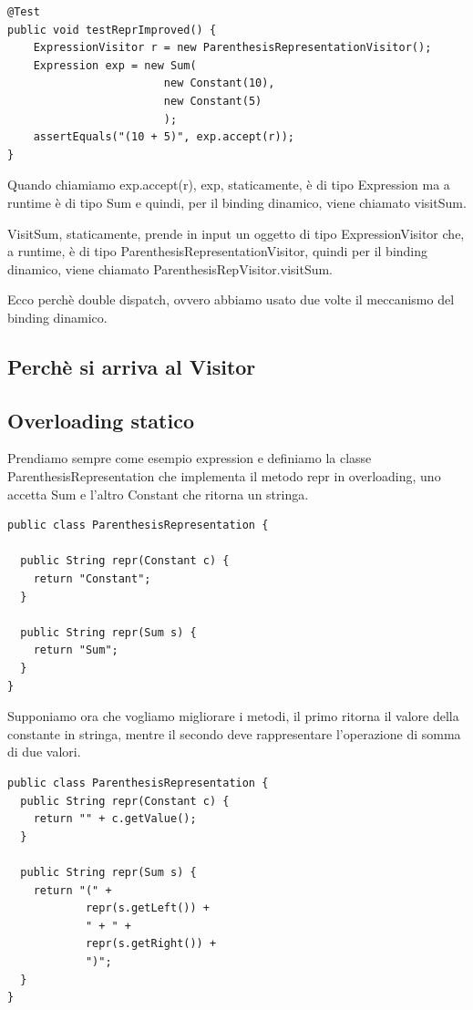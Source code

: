 \begin{lstlisting}
@Test
public void testReprImproved() {
    ExpressionVisitor r = new ParenthesisRepresentationVisitor();
    Expression exp = new Sum(
                        new Constant(10),
                        new Constant(5)
                        );
    assertEquals("(10 + 5)", exp.accept(r));
}
\end{lstlisting}

Quando chiamiamo exp.accept(r), exp, staticamente, è di tipo Expression ma a runtime è di tipo Sum e quindi, per il binding dinamico, viene chiamato visitSum.

VisitSum, staticamente, prende in input un oggetto di tipo ExpressionVisitor che, a runtime, è di tipo ParenthesisRepresentationVisitor, quindi per il binding dinamico, 
viene chiamato ParenthesisRepVisitor.visitSum.

Ecco perchè double dispatch, ovvero abbiamo usato due volte il meccanismo del binding dinamico.

\subsection{Perchè si arriva al Visitor}

\subsection{Overloading statico}
Prendiamo sempre come esempio expression e definiamo la classe ParenthesisRepresentation che implementa il metodo repr in overloading, uno accetta Sum e l'altro 
Constant che ritorna un stringa.
\begin{lstlisting}
public class ParenthesisRepresentation {
  
  public String repr(Constant c) {
    return "Constant";
  }
  
  public String repr(Sum s) {
    return "Sum";
  }
}   
\end{lstlisting}

Supponiamo ora che vogliamo migliorare i metodi, il primo ritorna il valore della constante in stringa, mentre il secondo deve rappresentare l'operazione di 
somma di due valori.
\begin{lstlisting}
public class ParenthesisRepresentation {
  public String repr(Constant c) {
    return "" + c.getValue();
  }

  public String repr(Sum s) {
    return "(" +
            repr(s.getLeft()) +
            " + " +
            repr(s.getRight()) +
            ")";
  }
}
\end{lstlisting}

